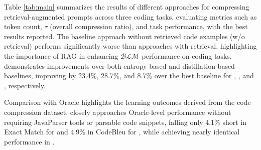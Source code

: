 


Table \ref{tab:main} summarizes the results of different approaches for compressing retrieval-augmented prompts across three coding tasks, evaluating metrics such as token count, $\tau$ (overall compression ratio), and task performance, with the best results reported. The baseline approach without retrieved code examples (w/o retrieval) performs significantly worse than approaches with retrieval, highlighting the importance of RAG in enhancing $\mathcal{BLM}$ performance on coding tasks. \ourtool demonstrates improvements over both entropy-based and distillation-based baselines, improving by 23.4\%, 28.7\%, and 8.7\% over the best baseline for \taskone, \tasktwo, and \taskthree, respectively. 




Comparison with Oracle highlights the learning outcomes derived from the code compression dataset. \ourtool closely approaches Oracle-level performance without requiring JavaParser tools or parsable code snippets, falling only 4.1\% short in Exact Match for \taskone and 4.9\% in CodeBleu for \tasktwo, while achieving nearly identical performance in \taskthree.


